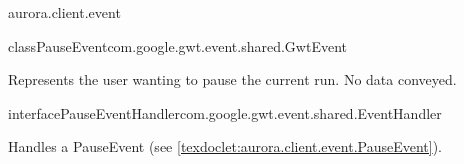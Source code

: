 \begin{texdocpackage}{aurora.client.event}
\begin{texdocclass}{class}{PauseEvent}{com.google.gwt.event.shared.GwtEvent}{}
\label{texdoclet:aurora.client.event.PauseEvent}
\begin{texdocclassintro}
Represents the user wanting to pause the current run.
 No data conveyed.\end{texdocclassintro}
\begin{texdocclassfields}
\end{texdocclassfields}
\begin{texdocclassconstructors}
\end{texdocclassconstructors}
\begin{texdocclassmethods}
\end{texdocclassmethods}
\end{texdocclass}


\begin{texdocclass}{interface}{PauseEventHandler}{}{com.google.gwt.event.shared.EventHandler}
\label{texdoclet:aurora.client.event.PauseEventHandler}
\begin{texdocclassintro}
Handles a PauseEvent (see \ref{texdoclet:aurora.client.event.PauseEvent}).\end{texdocclassintro}
\begin{texdocclassmethods}
\end{texdocclassmethods}
\end{texdocclass}



\end{texdocpackage}
